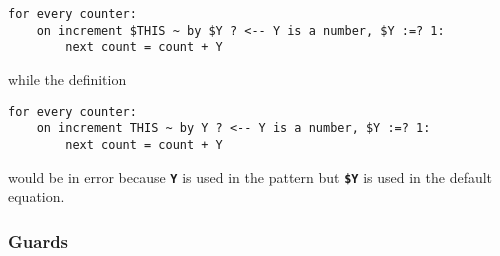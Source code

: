 \documentclass[12pt]{article}
\newcommand{\TT}[1]{{\tt \bfseries #1}}
\newenvironment{indpar}[1][0.3in]%
	{\begin{list}{}%
		     {\setlength{\itemsep}{0in}%
		      \setlength{\topsep}{0in}%
		      \setlength{\parsep}{1ex}%
		      \setlength{\labelwidth}{#1}%
		      \setlength{\leftmargin}{#1}%
		      \addtolength{\leftmargin}{\labelsep}}%
	 \item}%
	{\end{list}}
\begin{document}
\begin{indpar}\begin{verbatim}
for every counter:
    on increment $THIS ~ by $Y ? <-- Y is a number, $Y :=? 1:
        next count = count + Y
\end{verbatim}\end{indpar}

while the definition

\begin{indpar}\begin{verbatim}
for every counter:
    on increment THIS ~ by Y ? <-- Y is a number, $Y :=? 1:
        next count = count + Y
\end{verbatim}\end{indpar}

would be in error because \TT{Y} is used in the pattern but
\TT{\$Y} is used in the default equation.

\subsubsection{Guards}
\label{GUARDS}
\end{document}
